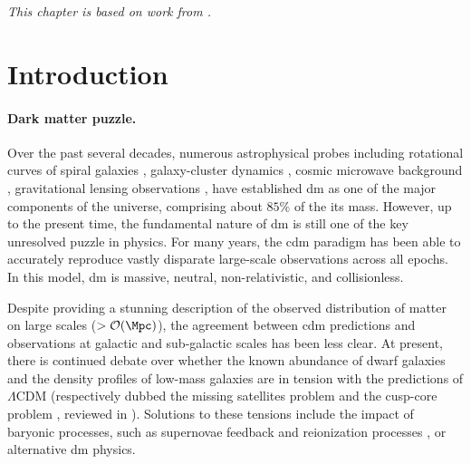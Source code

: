 \textit{This chapter is based on work from \cite{Montel:2022fhv, Coogan:2022cky}.}



\section{Introduction} \label{sec:sl-intro}

\paragraph*{Dark matter puzzle.} Over the past several decades, numerous astrophysical probes including rotational curves of spiral galaxies \citep{Rubin:1980zd}, galaxy-cluster dynamics \citep{Zwicky:1933gu}, cosmic microwave background \citep{Planck:2015fie}, gravitational lensing observations \citep{Taylor:1998uk}, have established \gls*{dm} as one of the major components of the universe, comprising about $85\%$ of the its mass. However, up to the present time, the fundamental nature of \gls*{dm} is still one of the key unresolved puzzle in physics. For many years, the \gls*{cdm} paradigm \citep{Peebles:1982ff} has been able to accurately reproduce vastly disparate large-scale observations across all epochs. In this model, \gls*{dm} is massive, neutral, non-relativistic, and collisionless. %

Despite providing a stunning description of the observed distribution of matter on large scales ($>\order{\si{\Mpc}}$), the agreement between \gls*{cdm} predictions and observations at galactic and sub-galactic scales has been less clear. At present, there is continued debate over whether the known abundance of dwarf galaxies and the density profiles of low-mass galaxies are in tension with the predictions of $\Lambda$CDM (respectively dubbed the missing satellites problem \citep{Moore:1999nt,Klypin:1999uc} and the cusp-core problem \citep{deBlok:1997zlw}, reviewed in \citealp{Bullock:2017xww}).
Solutions to these tensions include the impact of baryonic processes, such as supernovae feedback and reionization processes \citep{Bullock:2010uy}, or alternative \gls*{dm} physics. %

